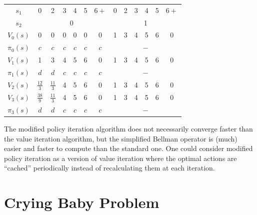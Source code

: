\documentclass[11pt, a4paper]{article}
\begin{document}
\begin{enumerate}
\begin{solution}
\begin{itemize}
            \begin{table}[h]
                \centering
                \begin{tabular}{c|cccccc|cccccc}
                    \toprule
                    $s_1$      & 0 & 2 & 3 & 4 & 5 & $6+$ & 0 & 2 & 3 & 4 & 5 & $6+$ \\
                    $s_2$      & \multicolumn{6}{c|}{0}   & \multicolumn{6}{c}{1}    \\
                    \midrule
                    $V_0(s)$   & 0 & 0 & 0 & 0 & 0 & 0    & 1 & 3 & 4 & 5 & 6 & 0    \\
                    $\pi_0(s)$ & $c$ & $c$ & $c$ & $c$ & $c$ & $c$ & \multicolumn{6}{c}{$-$} \\
                    $V_1(s)$   & 1 & 3 & 4 & 5 & 6 & 0    & 1 & 3 & 4 & 5 & 6 & 0    \\
                    $\pi_1(s)$ & $d$ & $d$ & $c$ & $c$ & $c$ & $c$ & \multicolumn{6}{c}{$-$} \\
                    $V_2(s)$   & $\frac{12}{3}$ & $\frac{11}{3}$ & 4 & 5 & 6 & 0 & 1 & 3 & 4 & 5 & 6 & 0 \\
                    $V_3(s)$   & $\frac{38}{9}$ & $\frac{11}{3}$ & 4 & 5 & 6 & 0 & 1 & 3 & 4 & 5 & 6 & 0 \\
                    $\pi_3(s)$ & $d$ & $d$ & $c$ & $c$ & $c$ & $c$ & \multicolumn{6}{c}{$-$} \\
                    \bottomrule
                \end{tabular}
            \end{table}

            The modified policy iteration algorithm does not necessarily converge faster than the value iteration algorithm, but the simplified Bellman operator is (much) easier and faster to compute than the standard one. One could consider modified policy iteration as a version of value iteration where the optimal actions are \enquote{cached} periodically instead of recalculating them at each iteration.
        \end{itemize}
    \end{solution}
\end{enumerate}

\newpage

\section{Crying Baby Problem}
\end{document}
